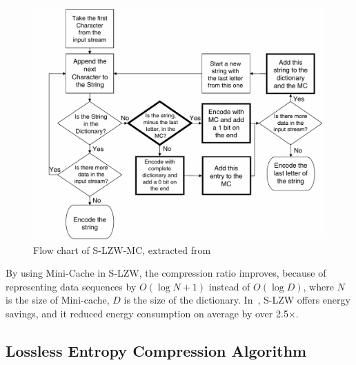 \begin{figure}[t]
    \centering
    \includegraphics[width=\textwidth]{figures/S-LZW-MC.png}
    \caption{Flow chart of S-LZW-MC, extracted from~\cite{sadler2006data}}
    \label{fig:S-LZW-MC}
\end{figure}

By using Mini-Cache in S-LZW, the compression ratio improves, because of
representing data sequences by $O(\log N + 1)$ instead of $O(\log D)$,
where $N$ is the size of Mini-cache, $D$ is the size of the dictionary.
In~\cite{sadler2006data}, S-LZW offers energy savings, and it reduced
energy consumption on average by over 2.5$\times$.


\subsection{Lossless Entropy Compression Algorithm}

